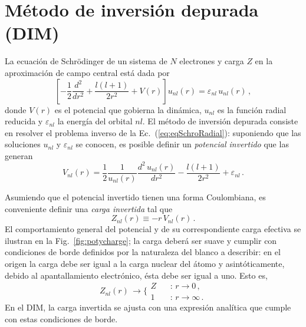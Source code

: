 \section{Método de inversión depurada (DIM)}
\label{sec:dimatomos}

La ecuación de Schr\"odinger de un sistema de $N$ electrones y carga $Z$ 
en la aproximación de campo central está dada por
\begin{equation}
 \left[ -\frac{1}{2}\frac{d^2}{dr^2} + \frac{l(l+1)}{2r^2} +
 V(r) \right] u_{nl}(r) = \varepsilon_{nl} \, u_{nl}(r)\,,
\label{eq:eqSchroRadial}
\end{equation}
donde $V(r)$ es el potencial que gobierna la dinámica, $u_{nl}$ es la 
función radial reducida y $\varepsilon_{nl}$ la energía del orbital 
$nl$. 
El método de inversión depurada consiste en resolver el problema inverso
de la Ec.~(\ref{eq:eqSchroRadial}): suponiendo que las soluciones 
$u_{nl}$ y $\varepsilon_{nl}$ se conocen, es posible definir un 
\textit{potencial invertido} que las generan
\begin{equation}
V_{nl}(r) = 
\frac{1}{2}\frac{1}{u_{nl}(r)} \frac{d^2\,u_{nl}(r)}{dr^{2}} - 
\frac{l(l+1)}{2r^{2}}+\varepsilon_{nl} \,.
\label{eq:Vinv}
\end{equation}

Asumiendo que el potencial invertido tienen una forma Coulombiana, 
es conveniente definir una \textit{carga invertida} tal que
\begin{equation}
Z_{nl}(r) \equiv -r \, V_{nl}(r) \,.
\label{eq:Zinv}
\end{equation}
El comportamiento general del potencial y de su correspondiente carga 
efectiva se ilustran en la Fig.~\ref{fig:potycharge}; la carga deberá 
ser suave y cumplir con condiciones de borde definidos por la naturaleza 
del blanco a describir: 
en el origen la carga debe ser igual a la carga nuclear del átomo y 
asintóticamente, debido al apantallamiento electrónico, ésta debe ser
igual a uno. Esto es,
\begin{equation}
Z_{nl}(r) \, \rightarrow 
\bigg\{ 
\begin{array}{ll}
Z  \ \  & \ \ \text{:\ \ }r  \rightarrow 0 \,, \\ 
1           & \ \ \text{:\ \ }r  \rightarrow \infty \,.
\end{array}
\label{eq:Zasympt}
\end{equation} 
En el DIM, la carga invertida se ajusta con una expresión analítica que 
cumple con estas condiciones de borde.

